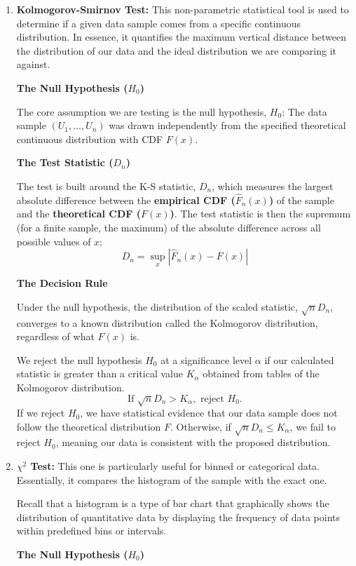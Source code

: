 \begin{enumerate}
    \item \textbf{Kolmogorov-Smirnov Test: }
        This non-parametric statistical tool is used to determine if a given data sample comes from a specific continuous distribution. In essence, it quantifies the maximum vertical distance between the distribution of our data and the ideal distribution we are comparing it against.

        \vspace{1em}
        \noindent\textbf{The Null Hypothesis ($H_0$)}
        \vspace{0.5em}

        The core assumption we are testing is the null hypothesis, $H_0$: The data sample $(U_1, \dots, U_n)$ was drawn independently from the specified theoretical continuous distribution with CDF $F(x)$.

        \vspace{1em}
        \noindent\textbf{The Test Statistic ($D_n$)}
        \vspace{0.5em}

        The test is built around the K-S statistic, $D_n$, which measures the largest absolute difference between the \textbf{empirical CDF ($\hat{F}_n(x)$)} of the sample and the \textbf{theoretical CDF ($F(x)$)}. The test statistic is then the supremum (for a finite sample, the maximum) of the absolute difference across all possible values of $x$:
        \[
        D_n = \sup_{x} |\hat{F}_n(x) - F(x)|
        \]

        \vspace{1em}
        \noindent\textbf{The Decision Rule}
        \vspace{0.5em}

        Under the null hypothesis, the distribution of the scaled statistic, $\sqrt{n}D_n$, converges to a known distribution called the Kolmogorov distribution, regardless of what $F(x)$ is. 

        We reject the null hypothesis $H_0$ at a significance level $\alpha$ if our calculated statistic is greater than a critical value $K_\alpha$ obtained from tables of the Kolmogorov distribution.
        \[
        \text{If } \sqrt{n}D_n > K_\alpha, \text{ reject } H_0.
        \]
        If we reject $H_0$, we have statistical evidence that our data sample does not follow the theoretical distribution $F$. Otherwise, if $\sqrt{n}D_n \le K_\alpha$, we fail to reject $H_0$, meaning our data is consistent with the proposed distribution.
    
    \item \textbf{$\chi^2$ Test: }
        This one is particularly useful for binned or categorical data. Essentially, it compares the histogram of the sample with the
        exact one.
        \begin{remark}
            Recall that a histogram is a type of bar chart that graphically shows the distribution of quantitative data by displaying the frequency of data points within predefined bins or intervals. 
        \end{remark}
        \vspace{1em}
        \noindent\textbf{The Null Hypothesis ($H_0$)}
        \vspace{0.5em}


\end{enumerate}
